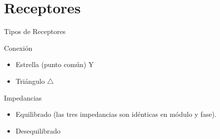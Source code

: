 \documentclass[aspectratio=169, usenames,svgnames,dvipsnames]{beamer}
\begin{document}
\section{Receptores}
\label{sec:org17c3297}
\begin{frame}[label={sec:org3e087f5}]{Tipos de Receptores}
\begin{block}{Conexión}
\begin{itemize}
\item \alert{Estrella} (punto común) Y
\item \alert{Triángulo} \(\triangle\)
\end{itemize}
\end{block}

\begin{block}{Impedancias}
\begin{itemize}
\item \alert{Equilibrado} (las tres impedancias son idénticas en módulo \alert{y} fase).
\item \alert{Desequilibrado}
\end{itemize}
\end{block}
\end{frame}
\end{document}
